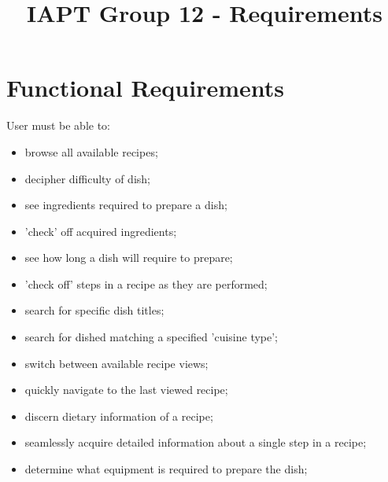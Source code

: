 \documentclass{article}
\title{IAPT Group 12 - Requirements}
\begin{document}
\section{Functional Requirements}
User must be able to:
\begin{itemize}
\item browse all available recipes;
\item decipher difficulty of dish;
\item see ingredients required to prepare a dish;
\item 'check' off acquired ingredients;
\item see how long a dish will require to prepare;
\item 'check off' steps in a recipe as they are performed;
\item search for specific dish titles;
\item search for dished matching a specified 'cuisine type';
\item switch between available recipe views;
\item quickly navigate to the last viewed recipe;
\item discern dietary information of a recipe;
\item seamlessly acquire detailed information about a single step in a recipe;
\item determine what equipment is required to prepare the dish;
\end{itemize}
\end{document}
